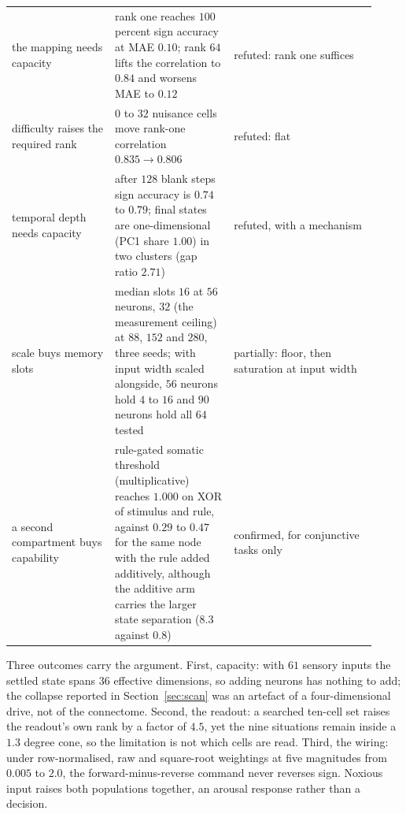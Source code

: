 \documentclass[11pt]{article}
\theoremstyle{remark}
\begin{document}
\begin{table}[t]
\begin{tabular}{p{0.26\linewidth}p{0.30\linewidth}p{0.36\linewidth}}
the mapping needs capacity & rank one reaches $100$ percent sign accuracy at MAE $0.10$; rank $64$
lifts the correlation to $0.84$ and worsens MAE to $0.12$ & refuted: rank one suffices \\
difficulty raises the required rank & $0$ to $32$ nuisance cells move rank-one correlation
$0.835\to0.806$ & refuted: flat \\
temporal depth needs capacity & after $128$ blank steps sign accuracy is $0.74$ to $0.79$; final
states are one-dimensional (PC1 share $1.00$) in two clusters (gap ratio $2.71$) &
refuted, with a mechanism \\
scale buys memory slots & median slots $16$ at $56$ neurons, $32$ (the measurement ceiling) at
$88$, $152$ and $280$, three seeds; with input width scaled alongside, $56$ neurons hold $4$ to $16$
and $90$ neurons hold all $64$ tested & partially: floor, then saturation at input width \\
a second compartment buys capability & rule-gated somatic threshold (multiplicative) reaches $1.000$
on XOR of stimulus and rule, against $0.29$ to $0.47$ for the same node with the rule added
additively, although the additive arm carries the larger state separation ($8.3$ against $0.8$) &
confirmed, for conjunctive tasks only \\
\bottomrule
\end{tabular}
\end{table}

Three outcomes carry the argument. First, capacity: with $61$ sensory inputs the settled state spans
$36$ effective dimensions, so adding neurons has nothing to add; the collapse reported in
Section~\ref{sec:scan} was an artefact of a four-dimensional drive, not of the connectome. Second, the
readout: a searched ten-cell set raises the readout's own rank by a factor of $4.5$, yet the nine
situations remain inside a $1.3$ degree cone, so the limitation is not which cells are read. Third,
the wiring: under row-normalised, raw and square-root weightings at five magnitudes from $0.005$ to
$2.0$, the forward-minus-reverse command never reverses sign. Noxious input raises both populations
together, an arousal response rather than a decision.
\end{document}
